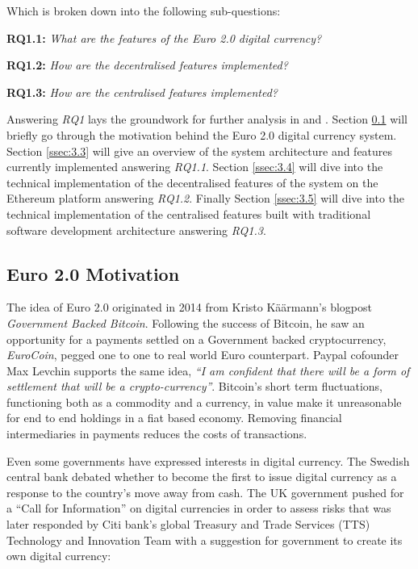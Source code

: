 \documentclass[12pt]{article} %
\newcommand{\hypernameref}[1]{\hyperref[#1]{\nameref{#1}}}
\begin{document}
Which is broken down into the following sub-questions:
\begin{quoting}
	\textbf{RQ1.1: }\textit{What are the features of the Euro 2.0 digital currency?}
\end{quoting}{
\begin{quoting}
	\textbf{RQ1.2: }\textit{How are the decentralised features implemented?}
\end{quoting}{
\begin{quoting}
	\textbf{RQ1.3: }\textit{How are the centralised features implemented?}
\end{quoting}

Answering \textit{RQ1} lays the groundwork for further analysis in \hypernameref{sec:4} and \hypernameref{sec:5}. Section \ref{ssec:3.2} will briefly go through the motivation behind the Euro 2.0 digital currency system. Section \ref{ssec:3.3} will give an overview of the system architecture and features currently implemented answering \textit{RQ1.1}. Section \ref{ssec:3.4} will dive into the technical implementation of the decentralised features of the system on the Ethereum platform answering \textit{RQ1.2}. Finally Section \ref{ssec:3.5} will dive into the technical implementation of the centralised features built with traditional software development architecture answering \textit{RQ1.3}.

\subsection{Euro 2.0 Motivation} \label{ssec:3.2}

The idea of Euro 2.0 originated in 2014 from Kristo Käärmann's blogpost \textit{Government Backed Bitcoin}\cite{kaarmann2014government}. Following the success of Bitcoin, he saw an opportunity for a payments settled on a Government backed cryptocurrency, \textit{EuroCoin}, pegged one to one to real world Euro counterpart. Paypal cofounder Max Levchin supports the same idea, \textit{``I am confident that there will be a form of settlement that will be a crypto-currency''}\cite{pando2014levchin}. Bitcoin's short term fluctuations, functioning both as a commodity and a currency, in value make it unreasonable for end to end holdings in a fiat based economy. Removing financial intermediaries in payments reduces the costs of transactions.

Even some governments have expressed interests in digital currency. The Swedish central bank debated whether to become the first to issue digital currency as a response to the country's move away from cash\cite{milne2016sweden}. The UK government pushed for a ``Call for Information'' on digital currencies in order to assess risks\cite{nermin2014ukcall} that was later responded by Citi bank's global Treasury and Trade Services (TTS) Technology and Innovation Team with a suggestion for government to create its own digital currency\cite{spaven2015ukcurrency}:

}}
\end{document}
